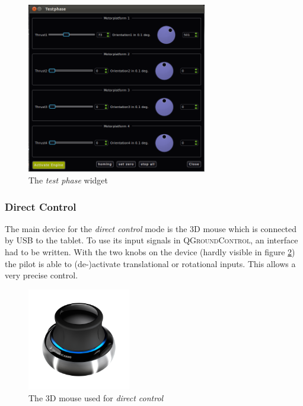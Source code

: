 \begin{figure}[H] %
	\begin{center}
		\includegraphics[width=0.7\textwidth]{qgc_test_phase}
		\caption{The \textit{test phase} widget }  
		\label{figure:qgc_test_phase}
	\end{center}
\end{figure}


\subsubsection{Direct Control}
The main device for the \textit{direct control} mode is the 3D mouse which is connected by USB to the tablet. To use its input signals in  \textsc{QGroundControl}, an interface had to be written. With the two knobs on the device (hardly visible in figure \ref{fig:3D_mouse}) the pilot is able to (de-)activate translational or rotational inputs. This allows a very precise control.

\begin{figure}[H] %
	\begin{center}
		\includegraphics[width=0.4\textwidth]{3dx_productimage}
		\caption{The 3D mouse used for \textit{direct control}}  
		\label{fig:3D_mouse}
	\end{center}
\end{figure}

